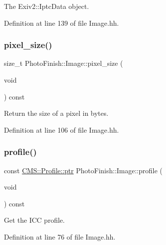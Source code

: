 The Exiv2\+::\+Iptc\+Data object. 



Definition at line 139 of file Image.\+hh.

\mbox{\label{class_photo_finish_1_1_image_a0671615066506ceed7419e67e31a0db1}} 
\subsubsection{\texorpdfstring{pixel\+\_\+size()}{pixel\_size()}}
{\footnotesize\ttfamily size\+\_\+t Photo\+Finish\+::\+Image\+::pixel\+\_\+size (\begin{DoxyParamCaption}\item[{void}]{ }\end{DoxyParamCaption}) const\hspace{0.3cm}{\ttfamily [inline]}}



Return the size of a pixel in bytes. 



Definition at line 106 of file Image.\+hh.

\mbox{\label{class_photo_finish_1_1_image_af70cbcdb6f40471c08a462cf10ea86fb}} 
\subsubsection{\texorpdfstring{profile()}{profile()}}
{\footnotesize\ttfamily const \hyperlink{class_c_m_s_1_1_profile_a7d5a80e1317d17dbfdf5ae69820ab08b}{C\+M\+S\+::\+Profile\+::ptr} Photo\+Finish\+::\+Image\+::profile (\begin{DoxyParamCaption}\item[{void}]{ }\end{DoxyParamCaption}) const\hspace{0.3cm}{\ttfamily [inline]}}



Get the I\+CC profile. 



Definition at line 76 of file Image.\+hh.

